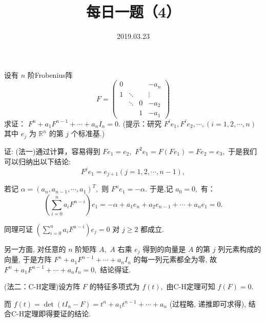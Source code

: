 \documentclass[UTF8]{ctexart}
\title{\textbf{每日一题（4）}}
\date{2019.03.23}
\begin{document}
\maketitle
设有 $n$ 阶Frobenius阵
\begin{equation*}
F=
  \left( \begin{array}{cccc}
    0 &        &   & -a_n \\
    1 & \ddots &   & \vdots \\
      & \ddots & 0 & -a_2 \\
      &        & 1 & -a_1
  \end{array}\right)
\end{equation*}
求证： $F^n+a_1F^{n-1}+ \cdots + a_nI_n = 0.$
(提示：研究 $F^ie_1, F^ie_2,\cdots,(i=1,2,\cdots,n)$ 其中 $e_j$ 为 $\mathbb{R}^n$ 的第 $j$ 个标准基.)

证: (法一)通过计算，容易得到 $Fe_1=e_2,$ $F^2e_1=F(Fe_1)=Fe_2=e_3,$
于是我们可以归纳出以下结论:
\[
F^je_1=e_{j+1}(j=1,2,\cdots,n-1),
\]

若记 $\alpha=(a_n,a_{n-1},\cdots,a_1)^T,$ 则 $F^ne_1=-\alpha.$ 于是,记 $a_0=0,$ 有：
\[
\left(\sum_{i=0}^{n}a_iF^{n-i}\right)e_1=-\alpha+a_1e_n+a_2e_{n-1}+\cdots+a_ne_1=0.
\]

同理可证 $\displaystyle\left(\sum_{i=0}^{n}a_iF^{n-i}\right)e_j=0$ 对 $j\geq2$ 都成立.

另一方面, 对任意的 $n$ 阶矩阵 $A,$ $A$ 右乘 $e_j$ 得到的向量是 $A$ 的第 $j$ 列元素构成的向量, 于是方阵 $F^n+a_1F^{n-1}+ \cdots + a_nI_n$ 的每一列元素都全为零, 故 $F^n+a_1F^ {n-1}+ \cdots + a_nI_n = 0,$ 结论得证.

(法二：C-H定理)设方阵 $F$ 的特征多项式为 $f(t),$ 由C-H定理可知 $f(F)=0$.

而 $f(t)=\det(tI_n-F)=t^n+a_1t^{n-1}+\cdots+a_n$ (过程略, 递推即可求得), 结合C-H定理即得要证的结论.
\end{document}
